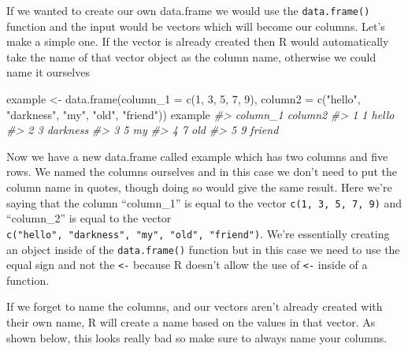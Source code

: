 \documentclass[
]{krantz}
\makeatletter
\newenvironment{Shaded}{\begin{snugshade}}{\end{snugshade}}
\newcommand{\AttributeTok}[1]{\textcolor[rgb]{0.61,0.61,0.61}{#1}}
\newcommand{\CommentTok}[1]{\textcolor[rgb]{0.37,0.37,0.37}{\textit{#1}}}
\newcommand{\DecValTok}[1]{\textcolor[rgb]{0.06,0.06,0.06}{#1}}
\newcommand{\FunctionTok}[1]{\textcolor[rgb]{0,0,0}{#1}}
\newcommand{\NormalTok}[1]{#1}
\newcommand{\OtherTok}[1]{\textcolor[rgb]{0.37,0.37,0.37}{#1}}
\newcommand{\StringTok}[1]{\textcolor[rgb]{0.5,0.5,0.5}{#1}}
\newenvironment{kframe}{%
\medskip{}
\setlength{\fboxsep}{.8em}
 \def\at@end@of@kframe{}%
 \ifinner\ifhmode%
  \def\at@end@of@kframe{\end{minipage}}%
  \begin{minipage}{\columnwidth}%
 \fi\fi%
 \def\FrameCommand##1{\hskip\@totalleftmargin \hskip-\fboxsep
 \colorbox{shadecolor}{##1}\hskip-\fboxsep
     \hskip-\linewidth \hskip-\@totalleftmargin \hskip\columnwidth}%
 \MakeFramed {\advance\hsize-\width
   \@totalleftmargin\z@ \linewidth\hsize
   \@setminipage}}%
 {\par\unskip\endMakeFramed%
 \at@end@of@kframe}
\renewenvironment{Shaded}{\begin{kframe}}{\end{kframe}}
\makeatother
\begin{document}
If we wanted to create our own data.frame we would use the \texttt{data.frame()} function and the input would be vectors which will become our columns. Let's make a simple one. If the vector is already created then R would automatically take the name of that vector object as the column name, otherwise we could name it ourselves

\begin{Shaded}
\begin{Highlighting}[]
\NormalTok{example }\OtherTok{\textless{}{-}} \FunctionTok{data.frame}\NormalTok{(}\AttributeTok{column\_1 =} \FunctionTok{c}\NormalTok{(}\DecValTok{1}\NormalTok{, }\DecValTok{3}\NormalTok{, }\DecValTok{5}\NormalTok{, }\DecValTok{7}\NormalTok{, }\DecValTok{9}\NormalTok{),}
                      \AttributeTok{column2  =} \FunctionTok{c}\NormalTok{(}\StringTok{"hello"}\NormalTok{, }\StringTok{"darkness"}\NormalTok{, }\StringTok{"my"}\NormalTok{, }\StringTok{"old"}\NormalTok{, }\StringTok{"friend"}\NormalTok{))}
\NormalTok{example}
\CommentTok{\#\textgreater{}   column\_1  column2}
\CommentTok{\#\textgreater{} 1        1    hello}
\CommentTok{\#\textgreater{} 2        3 darkness}
\CommentTok{\#\textgreater{} 3        5       my}
\CommentTok{\#\textgreater{} 4        7      old}
\CommentTok{\#\textgreater{} 5        9   friend}
\end{Highlighting}
\end{Shaded}

Now we have a new data.frame called example which has two columns and five rows. We named the columns ourselves and in this case we don't need to put the column name in quotes, though doing so would give the same result. Here we're saying that the column ``column\_1'' is equal to the vector \texttt{c(1,\ 3,\ 5,\ 7,\ 9)} and ``column\_2'' is equal to the vector \texttt{c("hello",\ "darkness",\ "my",\ "old",\ "friend")}. We're essentially creating an object inside of the \texttt{data.frame()} function but in this case we need to use the equal sign and not the \texttt{\textless{}-} because R doesn't allow the use of \texttt{\textless{}-} inside of a function.

If we forget to name the columns, and our vectors aren't already created with their own name, R will create a name based on the values in that vector. As shown below, this looks really bad so make sure to always name your columns.
\end{document}
